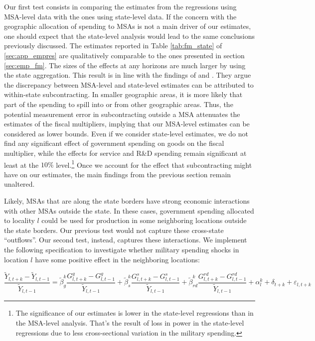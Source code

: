\documentclass[dv_diss_main.tex]{subfiles}
\begin{document}
Our first test consists in comparing the estimates from the regressions using MSA-level data with the ones using state-level data. If the concern with the geographic allocation of spending to MSAs is not a main driver of our estimates, one should expect that the state-level analysis would lead to the same conclusions previously discussed. The estimates reported in Table \ref{tab:fm_state} of \ref{sec:app_empres} are qualitatively comparable to the ones presented in section \ref{sec:emp_fm}. The sizes of the effects at any horizons are much larger by using the state aggregation. This result is in line with the findings of \cite{Demyanyk2019} and \cite{Auerbach2020}. They argue the discrepancy between MSA-level and state-level estimates can be attributed to within-state subcontracting. In smaller geographic areas, it is more likely that part of the spending to spill into or from other geographic areas. Thus, the potential measurement error in subcontracting outside a MSA attenuates the estimates of the fiscal multipliers, implying that our MSA-level estimates can be considered as lower bounds. Even if we consider state-level estimates, we do not find any significant effect of government spending on goods on the fiscal multiplier, while the effects for service and R\&D spending remain significant at least at the $10\%$ level.\footnote{The significance of our estimates is lower in the state-level regressions than in the MSA-level analysis. That's the result of loss in power in the state-level regressions due to less cross-sectional variation in the military spending.} Once we account for the effect that subcontracting might have on our estimates, the main findings from the previous section remain unaltered.

Likely, MSAs that are along the state borders have strong economic interactions with other MSAs outside the state. In these cases, government spending allocated to locality $l$ could be used for production in some neighboring locations outside the state borders. Our previous test would not capture these cross-state ``outflows''. Our second test, instead, captures these interactions. We implement the following specification to investigate whether military spending shocks in location $l$ have some positive effect in the neighboring locations:


\begin{equation}
    \frac{\tilde{Y}_{l,t+k} - \tilde{Y}_{l,t-1}}{\tilde{Y}_{l,t-1}} = \tilde{\beta}_{g}^k \frac{G^{g}_{l,t+k}-G^{g}_{l,t-1}}{\tilde{Y}_{l,t-1}} + \tilde{\beta}_{s}^k \frac{G^{s}_{l,t+k}-G^{s}_{l,t-1}}{\tilde{Y}_{l,t-1}} + \tilde{\beta}_{rd}^k \frac{G^{rd}_{l,t+k}-G^{rd}_{l,t-1}}{\tilde{Y}_{l,t-1}} + \alpha_l^k + \delta_{t+k} + \varepsilon_{l,t+k}
\end{equation}\label{eq:fm_spill}
\end{document}
